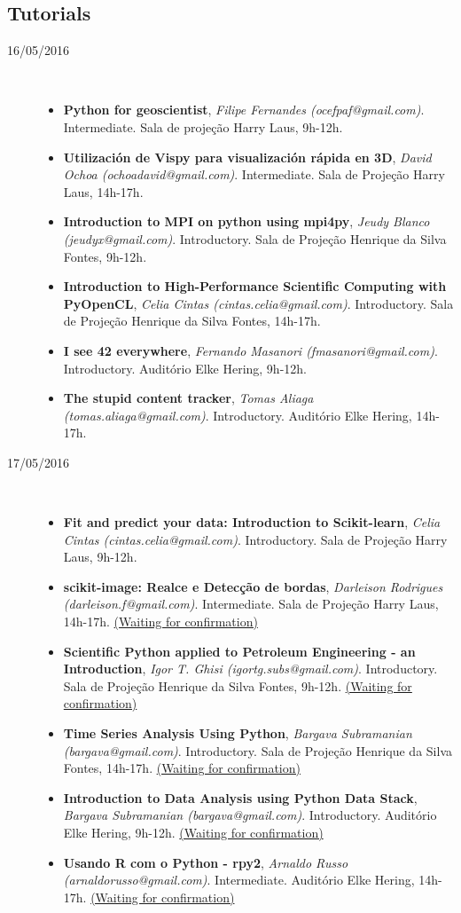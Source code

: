 \documentclass[12pt]{article}
\begin{document}
\subsection*{Tutorials}
\begin{description}
   \item[16/05/2016] \ 
   \begin{itemize}
      \item \textbf{Python for geoscientist}, \emph{Filipe Fernandes (ocefpaf@gmail.com)}. Intermediate. Sala de projeção Harry Laus, 9h-12h.
      \item \textbf{Utilización de Vispy para visualización rápida en 3D}, \emph{David Ochoa (ochoadavid@gmail.com)}. Intermediate. Sala de Projeção Harry Laus, 14h-17h.
      \item \textbf{Introduction to MPI on python using mpi4py}, \emph{Jeudy Blanco (jeudyx@gmail.com)}. Introductory. Sala de Projeção Henrique da Silva Fontes, 9h-12h.
      \item \textbf{Introduction to High-Performance Scientific Computing with PyOpenCL}, \emph{Celia Cintas (cintas.celia@gmail.com)}. Introductory. Sala de Projeção Henrique da Silva Fontes, 14h-17h.
      \item \textbf{I see 42 everywhere}, \emph{Fernando Masanori (fmasanori@gmail.com)}. Introductory. Auditório Elke Hering, 9h-12h.
      \item \textbf{The stupid content tracker}, \emph{Tomas Aliaga (tomas.aliaga@gmail.com)}. Introductory. Auditório Elke Hering, 14h-17h.
   \end{itemize}
   \item[17/05/2016] \ 
   \begin{itemize}
      \item \textbf{Fit and predict your data: Introduction to Scikit-learn}, \emph{Celia Cintas (cintas.celia@gmail.com)}. Introductory. Sala de Projeção Harry Laus, 9h-12h.
      \item \textbf{scikit-image: Realce e Detecção de bordas}, \emph{Darleison Rodrigues (darleison.f@gmail.com)}. Intermediate. Sala de Projeção Harry Laus, 14h-17h. \underline{(Waiting for confirmation)}
      \item \textbf{Scientific Python applied to Petroleum Engineering - an Introduction}, \emph{Igor T. Ghisi (igortg.subs@gmail.com)}. Introductory. Sala de Projeção Henrique da Silva Fontes, 9h-12h. \underline{(Waiting for confirmation)} 
      \item \textbf{Time Series Analysis Using Python}, \emph{Bargava Subramanian (bargava@gmail.com)}. Introductory. Sala de Projeção Henrique da Silva Fontes, 14h-17h. \underline{(Waiting for confirmation)}
      \item \textbf{Introduction to Data Analysis using Python Data Stack}, \emph{Bargava Subramanian (bargava@gmail.com)}. Introductory. Auditório Elke Hering, 9h-12h. \underline{(Waiting for confirmation)}
    \item \textbf{Usando R com o Python - rpy2}, \emph{Arnaldo Russo (arnaldorusso@gmail.com)}. Intermediate. Auditório Elke Hering, 14h-17h. \underline{(Waiting for confirmation)}
   \end{itemize}
\end{description}
\end{document}
